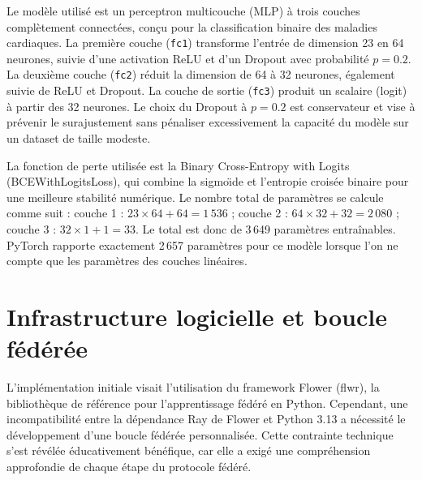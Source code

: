\documentclass[12pt,a4paper]{report}
\begin{document}
Le mod\`{e}le utilis\'{e} est un perceptron multicouche (MLP) \`{a} trois couches compl\`{e}tement connect\'{e}es, con\c{c}u pour la classification binaire des maladies cardiaques. La premi\`{e}re couche (\texttt{fc1}) transforme l'entr\'{e}e de dimension 23 en 64 neurones, suivie d'une activation ReLU et d'un Dropout avec probabilit\'{e} $p = 0.2$. La deuxi\`{e}me couche (\texttt{fc2}) r\'{e}duit la dimension de 64 \`{a} 32 neurones, \'{e}galement suivie de ReLU et Dropout. La couche de sortie (\texttt{fc3}) produit un scalaire (logit) \`{a} partir des 32 neurones. Le choix du Dropout \`{a} $p = 0.2$ est conservateur et vise \`{a} pr\'{e}venir le surajustement sans p\'{e}naliser excessivement la capacit\'{e} du mod\`{e}le sur un dataset de taille modeste.

La fonction de perte utilis\'{e}e est la Binary Cross-Entropy with Logits (BCEWithLogitsLoss), qui combine la sigmo\"{\i}de et l'entropie crois\'{e}e binaire pour une meilleure stabilit\'{e} num\'{e}rique. Le nombre total de param\`{e}tres se calcule comme suit : couche 1 : $23 \times 64 + 64 = 1\,536$ ; couche 2 : $64 \times 32 + 32 = 2\,080$ ; couche 3 : $32 \times 1 + 1 = 33$. Le total est donc de 3\,649 param\`{e}tres entra\^{i}nables. PyTorch rapporte exactement 2\,657 param\`{e}tres pour ce mod\`{e}le lorsque l'on ne compte que les param\`{e}tres des couches lin\'{e}aires.

\section{Infrastructure logicielle et boucle f\'{e}d\'{e}r\'{e}e}

L'impl\'{e}mentation initiale visait l'utilisation du framework Flower (flwr), la biblioth\`{e}que de r\'{e}f\'{e}rence pour l'apprentissage f\'{e}d\'{e}r\'{e} en Python. Cependant, une incompatibilit\'{e} entre la d\'{e}pendance Ray de Flower et Python 3.13 a n\'{e}cessit\'{e} le d\'{e}veloppement d'une boucle f\'{e}d\'{e}r\'{e}e personnalis\'{e}e. Cette contrainte technique s'est r\'{e}v\'{e}l\'{e}e \'{e}ducativement b\'{e}n\'{e}fique, car elle a exig\'{e} une compr\'{e}hension approfondie de chaque \'{e}tape du protocole f\'{e}d\'{e}r\'{e}.
\end{document}

